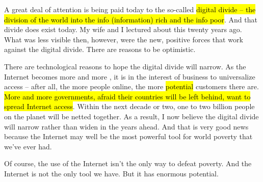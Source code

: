 A great deal of attention is being paid today to the so-called \hl{digital divide -- the division of the world into the info (information) rich and the info poor}. And that divide does exist today. My wife and I lectured about this 
  twenty years ago. What was less visible then, however, were the new, positive forces that work against the digital divide. There are reasons to be optimistic.

There are technological reasons to hope the digital divide will narrow. As the Internet becomes more and more , it is in the interest of business to universalize access -- after all, the more people online, the more \hl{potential} customers there are. \hl{More and more governments, afraid their countries will be left behind, want to spread Internet access}. Within the next decade or two, one to two billion people on the planet will be netted together. As a result, I now believe the digital divide will narrow rather than widen in the years ahead. And that is very good news because the Internet may well be the most powerful tool for 
 world poverty that we’ve ever had.

Of course, the use of the Internet isn’t the only way to defeat poverty. And the Internet is not the only tool we have. But it has enormous potential.


